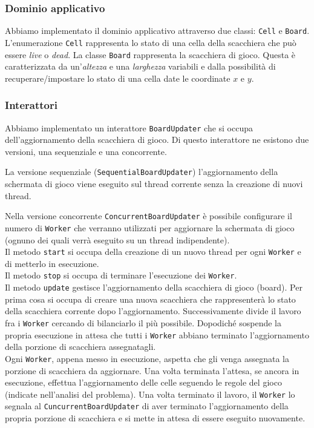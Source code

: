 ﻿\documentclass[a4paper]{article}
\begin{document}
\subsubsection{Dominio applicativo}\label{dominio-applicativo}

Abbiamo implementato il dominio applicativo attraverso due classi:
\texttt{Cell} e \texttt{Board}.\\
L'enumerazione \texttt{Cell} rappresenta lo stato di una cella della scacchiera che può essere \textit{live} o \textit{dead}.
La classe \texttt{Board} rappresenta la scacchiera di gioco. Questa è caratterizzata da un'\textit{altezza} e una \textit{larghezza} variabili e dalla possibilità di recuperare/impostare lo stato di una cella date le coordinate $x$ e $y$.

\subsubsection{Interattori}\label{interattori}

Abbiamo implementato un interattore \texttt{BoardUpdater} che si occupa dell'aggiornamento della scacchiera di gioco. Di questo interattore ne esistono due versioni, una sequenziale e una concorrente.

La versione sequenziale (\texttt{SequentialBoardUpdater}) l'aggiornamento della schermata di gioco viene eseguito sul thread corrente senza la creazione di nuovi thread.

Nella versione concorrente \texttt{ConcurrentBoardUpdater} è possibile configurare il numero di \texttt{Worker} che verranno utilizzati per aggiornare la schermata di gioco (ognuno dei quali verrà eseguito su un thread indipendente).\\
Il metodo \texttt{start} si occupa della creazione di un nuovo thread per ogni \texttt{Worker} e di metterlo in esecuzione.\\
Il metodo \texttt{stop} si occupa di terminare l'esecuzione dei \texttt{Worker}.\\
Il metodo \texttt{update} gestisce l'aggiornamento della scacchiera di gioco (board). Per prima cosa si occupa di creare una nuova scacchiera che rappresenterà lo stato della scacchiera corrente dopo l'aggiornamento. Successivamente divide il lavoro fra i \texttt{Worker} cercando di bilanciarlo il più possibile. Dopodiché sospende la propria esecuzione in attesa che tutti i \texttt{Worker} abbiano terminato l'aggiornamento della porzione di scacchiera assegnatagli.\\
Ogni \texttt{Worker}, appena messo in esecuzione, aspetta che gli venga assegnata la porzione di scacchiera da aggiornare. Una volta terminata l'attesa, se ancora in esecuzione, effettua l'aggiornamento delle celle seguendo le regole del gioco (indicate nell'analisi del problema). Una volta terminato il lavoro, il \texttt{Worker} lo segnala al \texttt{CuncurrentBoardUpdater} di aver terminato l'aggiornamento della propria porzione di scacchiera e si mette in attesa di essere eseguito nuovamente.
\end{document}
